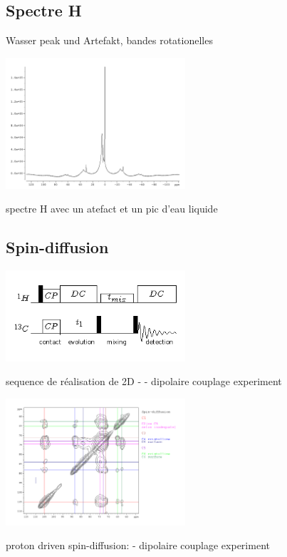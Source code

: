 \documentclass[a4paper,12pt]{scrartcl}
\begin{document}
  \subsection{Spectre H}
   Wasser peak und Artefakt, bandes rotationelles
\begin{figurehere}
    \center
    \includegraphics[width=0.5\textwidth]{bilder/proton_spektrum.png}
    \caption{spectre H avec un atefact et un pic d'eau liquide}
   \end{figurehere}
  \subsection{Spin-diffusion}
\begin{figurehere}
    \center
     \includegraphics[width=0.5\textwidth]{bilder/PDSD2.png}
     \caption{sequence de réalisation de 2D -  -  dipolaire couplage experiment}
    \end{figurehere}
\begin{figurehere}
    \center
    \includegraphics[width=0.5\textwidth]{bilder/spin_diff.png}
    \caption{proton driven spin-diffusion:  -  dipolaire couplage experiment}
   \end{figurehere}
  
\end{document}
